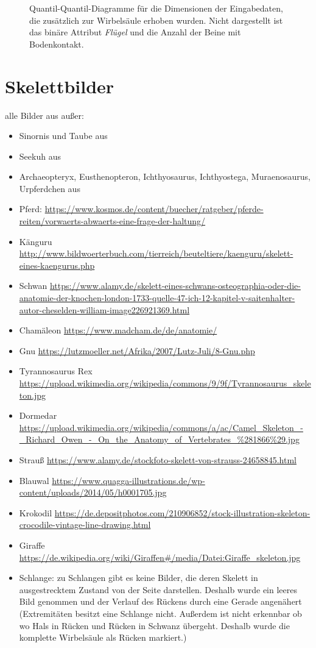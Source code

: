 \begin{figure}
   \caption{Quantil-Quantil-Diagramme für die Dimensionen der Eingabedaten, die zusätzlich zur Wirbelsäule erhoben wurden. Nicht dargestellt ist das binäre Attribut \emph{Flügel} und die Anzahl der Beine mit Bodenkontakt.}
   \label{qq_diagrams_rest}
  \end{figure}
 
 
 \section{Skelettbilder}
 \label{appendix_pca_skeletons}
 
 
 alle Bilder aus \cite{Spezielle_Zoologie} außer:
 \begin{itemize}
  \item Sinornis und Taube aus \cite{Vergleichende_Anatomie}
  \item Seekuh aus \cite{Zoologie25Wehner}
  \item Archaeopteryx, Eusthenopteron, Ichthyosaurus, Ichthyostega, Muraenosaurus, Urpferdchen aus \cite{Zoologie24Wehner}
  \item Pferd: \url{https://www.kosmos.de/content/buecher/ratgeber/pferde-reiten/vorwaerts-abwaerts-eine-frage-der-haltung/}
  \item Känguru \url{http://www.bildwoerterbuch.com/tierreich/beuteltiere/kaenguru/skelett-eines-kaengurus.php}
  \item Schwan \url{https://www.alamy.de/skelett-eines-schwans-osteographia-oder-die-anatomie-der-knochen-london-1733-quelle-47-ich-12-kapitel-v-saitenhalter-autor-cheselden-william-image226921369.html}
  \item Chamäleon \url{https://www.madcham.de/de/anatomie/}
  \item Gnu \url{https://lutzmoeller.net/Afrika/2007/Lutz-Juli/8-Gnu.php}
  \item Tyrannosaurus Rex \url{https://upload.wikimedia.org/wikipedia/commons/9/9f/Tyrannosaurus_skeleton.jpg}
  \item Dormedar \url{https://upload.wikimedia.org/wikipedia/commons/a/ac/Camel_Skeleton_-_Richard_Owen_-_On_the_Anatomy_of_Vertebrates_\%281866\%29.jpg}
  \item Strauß \url{https://www.alamy.de/stockfoto-skelett-von-strauss-24658845.html}
  \item Blauwal \url{https://www.quagga-illustrations.de/wp-content/uploads/2014/05/h0001705.jpg}
  \item Krokodil \url{https://de.depositphotos.com/210906852/stock-illustration-skeleton-crocodile-vintage-line-drawing.html}
  \item Giraffe \url{https://de.wikipedia.org/wiki/Giraffen#/media/Datei:Giraffe_skeleton.jpg}
  \item Schlange: zu Schlangen gibt es keine Bilder, die deren Skelett in ausgestrecktem Zustand von der Seite darstellen. Deshalb wurde ein leeres Bild genommen und der Verlauf des Rückens durch eine Gerade angenähert (Extremitäten besitzt eine Schlange nicht. Außerdem ist nicht erkennbar ob \bzw wo Hals in Rücken und Rücken in Schwanz übergeht. Deshalb wurde die komplette Wirbelsäule als Rücken markiert.)
 \end{itemize}

